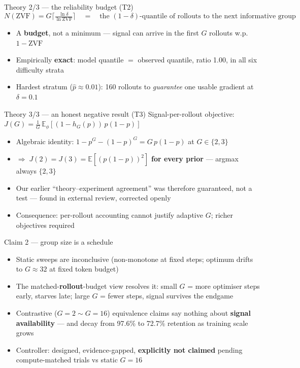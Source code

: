 \documentclass[11pt,aspectratio=169]{beamer}
\newcommand{\ZVF}{\ensuremath{\mathrm{ZVF}}}
\begin{document}
\begin{frame}{Theory 2/3 — the reliability budget (T2)}
\[
N(\ZVF)=G\Big\lceil \tfrac{\ln\delta}{\ln \ZVF}\Big\rceil
\quad = \quad
\text{the } (1{-}\delta)\text{-quantile of rollouts to the next
informative group}
\]
\begin{itemize}
  \item A \textbf{budget}, not a minimum — signal can arrive in the first
        $G$ rollouts w.p.\ $1-\ZVF$
  \item Empirically \textbf{exact}: model quantile $=$ observed quantile,
        ratio 1.00, in all six difficulty strata
  \item Hardest stratum ($\hat p\!\approx\!0.01$): 160 rollouts to
        \emph{guarantee} one usable gradient at $\delta{=}0.1$
\end{itemize}
\end{frame}

\begin{frame}{Theory 3/3 — an honest negative result (T3)}
Signal-per-rollout objective:
$J(G)=\frac1G\,\mathbb{E}_\phi[(1-h_G(p))\,p(1-p)]$
\begin{itemize}
  \item Algebraic identity: $1-p^G-(1-p)^G = G\,p(1-p)$ at $G\in\{2,3\}$
  \item $\Rightarrow\; J(2)=J(3)=\mathbb{E}[(p(1-p))^2]$
        \textbf{for every prior} — argmax always $\{2,3\}$
  \item Our earlier ``theory--experiment agreement'' was therefore
        \alert{guaranteed, not a test} — found in external review,
        corrected openly
  \item Consequence: per-rollout accounting cannot justify adaptive $G$;
        richer objectives required
\end{itemize}
\end{frame}

\begin{frame}{Claim 2 — group size is a schedule}
\begin{itemize}
  \item Static sweeps are inconclusive (non-monotone at fixed steps;
        optimum drifts to $G{\approx}32$ at fixed token budget)
  \item The matched-\textbf{rollout}-budget view resolves it:
        small $G$ = more optimiser steps early, starves late;
        large $G$ = fewer steps, signal survives the endgame
  \item Contrastive ($G{=}2\!\sim\!G{=}16$) equivalence claims say nothing
        about \textbf{signal availability} — and decay from
        97.6\% to 72.7\% retention as training scale grows
  \item Controller: designed, evidence-gapped, \textbf{explicitly not
        claimed} pending compute-matched trials vs static $G{=}16$
\end{itemize}
\end{frame}
\end{document}

